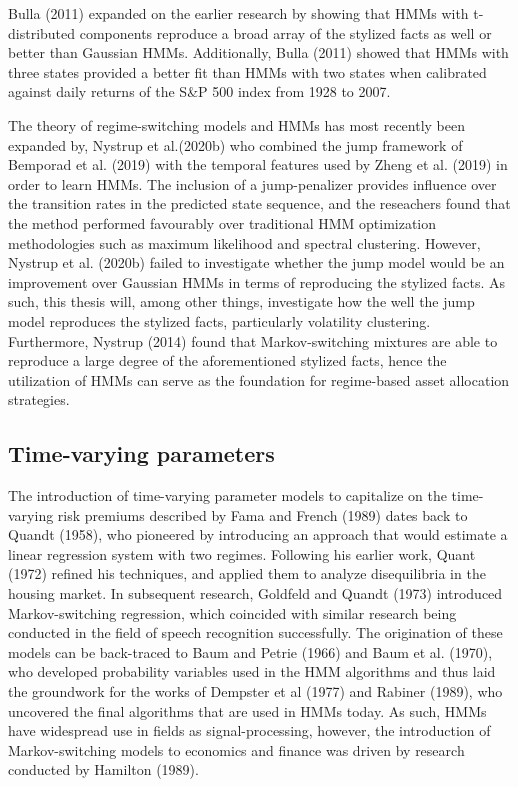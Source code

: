 Bulla (2011) expanded on the earlier research by showing that HMMs with t-distributed components reproduce a broad array of the stylized facts as well or better than Gaussian HMMs. Additionally, Bulla (2011) showed that HMMs with three states provided a better fit than HMMs with two states when calibrated against daily returns of the S\&P 500 index from 1928 to 2007. 

The theory of regime-switching models and HMMs has most recently been expanded by, Nystrup et al.(2020b) who combined the jump framework of Bemporad et al. (2019) with the temporal features used by Zheng et al. (2019) in order to learn HMMs. The inclusion of a jump-penalizer provides influence over the transition rates in the predicted state sequence, and the reseachers found that the method performed favourably over traditional HMM optimization methodologies such as maximum likelihood and spectral clustering. However, Nystrup et al. (2020b) failed to investigate whether the jump model would be an improvement over Gaussian HMMs in terms of reproducing the stylized facts. As such, this thesis will, among other things, investigate how the well the jump model reproduces the stylized facts, particularly volatility clustering. Furthermore, Nystrup (2014) found that Markov-switching mixtures are able to reproduce a large degree of the aforementioned stylized facts, hence the utilization of HMMs can serve as the foundation for regime-based asset allocation strategies. 


\subsection{Time-varying parameters}
The introduction of time-varying parameter models to capitalize on the time-varying risk premiums described
by Fama and French (1989) dates back to Quandt (1958), who pioneered by introducing an approach that would estimate a linear regression system with two regimes. Following his earlier work, Quant (1972) refined his techniques, and applied them to analyze disequilibria in the housing market. In subsequent research, Goldfeld and Quandt (1973) introduced Markov-switching regression, which coincided with similar research being conducted in the field of speech recognition successfully. The origination of these models can be back-traced to Baum and Petrie (1966) and Baum et al. (1970), who developed probability variables used in the HMM algorithms and thus laid the groundwork for the works of Dempster et al (1977) and Rabiner (1989), who uncovered the final algorithms that are used in HMMs today. As such, HMMs have widespread use in fields as signal-processing, however, the introduction of Markov-switching models to economics and finance was driven by research conducted by Hamilton (1989).


